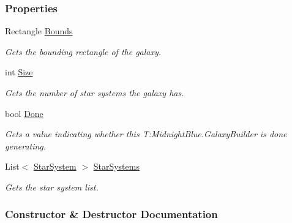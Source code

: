 \subsubsection*{Properties}
\begin{DoxyCompactItemize}
\item 
Rectangle \hyperlink{class_midnight_blue_1_1_galaxy_builder_a9051fa0f379b34dae5a6dcd287da7d9d}{Bounds}
\begin{DoxyCompactList}\small\item\em Gets the bounding rectangle of the galaxy. \end{DoxyCompactList}\item 
int \hyperlink{class_midnight_blue_1_1_galaxy_builder_a295af2d47a68bdac0845f3540c815a63}{Size}
\begin{DoxyCompactList}\small\item\em Gets the number of star systems the galaxy has. \end{DoxyCompactList}\item 
bool \hyperlink{class_midnight_blue_1_1_galaxy_builder_a4b496c6930a56d2469c21acb54ff23ec}{Done}
\begin{DoxyCompactList}\small\item\em Gets a value indicating whether this T\+:\+Midnight\+Blue.\+Galaxy\+Builder is done generating. \end{DoxyCompactList}\item 
List$<$ \hyperlink{class_midnight_blue_1_1_star_system}{Star\+System} $>$ \hyperlink{class_midnight_blue_1_1_galaxy_builder_a85ce4bbc7de1c14ad7e7f0af3e92c1a1}{Star\+Systems}
\begin{DoxyCompactList}\small\item\em Gets the star system list. \end{DoxyCompactList}\end{DoxyCompactItemize}


\subsubsection{Constructor \& Destructor Documentation}
\hypertarget{class_midnight_blue_1_1_galaxy_builder_a926e49d9c54675035304d7506c02a0b9}{}\label{class_midnight_blue_1_1_galaxy_builder_a926e49d9c54675035304d7506c02a0b9} 
